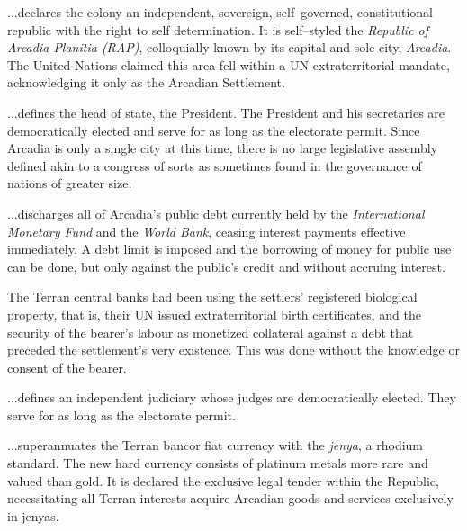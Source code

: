 
\startarticle
\item %

...declares the colony an independent, sovereign, self--governed, constitutional republic with the right to self determination. It is self--styled the {\it Republic of Arcadia Planitia (RAP)}, colloquially known by its capital and sole city, {\it Arcadia}. The United Nations claimed this area fell within a UN extraterritorial mandate, acknowledging it only as the Arcadian Settlement.

\item %

...defines the head of state, the President. The President and his secretaries are democratically elected and serve for as long as the electorate permit. Since Arcadia is only a single city at this time, there is no large legislative assembly defined akin to a congress of sorts as sometimes found in the governance of nations of greater size.

\item %

...discharges all of Arcadia's public debt currently held by the {\it International Monetary Fund} and the {\it World Bank}, ceasing interest payments effective immediately. A debt limit is imposed and the borrowing of money for public use can be done, but only against the public's credit and without accruing interest.

The Terran central banks had been using the settlers' registered biological property, that is, their UN issued extraterritorial birth certificates, and the security of the bearer's labour as monetized collateral against a debt that preceded the settlement's very existence. This was done without the knowledge or consent of the bearer.

\item %

...defines an independent judiciary whose judges are democratically elected. They serve for as long as the electorate permit.
\stoparticle

\startarticle[start=7]
\item %

...superannuates the Terran bancor fiat currency with the {\it jenya}, a rhodium standard. The new hard currency consists of platinum metals more rare and valued than gold. It is declared the exclusive legal tender within the Republic, necessitating all Terran interests acquire Arcadian goods and services exclusively in jenyas.

